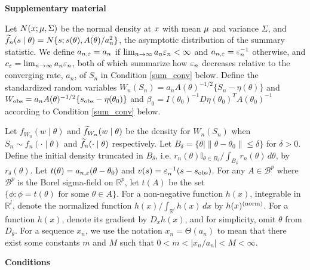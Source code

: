 \documentclass{article}
\begin{document}
{\bf Supplementary material}


\noindent Let $N({}{x};{}{\mu},\Sigma)$ be the normal density at ${}{x}$
with mean ${}{\mu}$ and variance $\Sigma$, and $\widetilde{f}_{n}({}{s}\mid{}{\theta})=N\{{}{s};{}{s}({}{\theta}),A({}{\theta})/a_{n}^{2}\}$, the asymptotic distribution of the summary statistic.
We define $a_{n,\varepsilon}=a_{n}$ if $\lim_{n\rightarrow\infty}a_{n}\varepsilon_{n}<\infty$
and $a_{n,\varepsilon}=\varepsilon_{n}^{-1}$ otherwise, and $c_{\varepsilon}=\lim_{n\rightarrow\infty}a_{n}\varepsilon_{n}$,
both of which summarize how $\varepsilon_{n}$ decreases relative to the
converging rate, $a_{n}$, of $S_{n}$ in Condition \ref{sum_conv} below. Define
the standardized random variables $W_{n}(S_{n})=a_{n}A(\theta)^{-1/2}\{S_{n}-\eta(\theta)\}$
and $W_{\rm obs}=a_{n}A(\theta)^{-1/2}\{s_{\rm obs}-\eta(\theta_0)\}$ and $\beta_{0}=I(\theta_0)^{-1}D\eta(\theta_0)^{T}A(\theta_0)^{-1}$ according to Condition \ref{sum_conv} below. 

Let $f_{W_{n}}(w\mid\theta)$ and
$\widetilde{f}_{W_{n}}(w\mid\theta)$ be the density for $W_{n}(S_{n})$ when
$S_{n}\sim f_{n}(\cdot\mid\theta)$ and $\widetilde{f}_n(\cdot\mid\theta)$ respectively.
Let $B_{\delta}=\{\theta\mid\|\theta-\theta_{0}\|\leq\delta\}$ for
$\delta>0$. Define the initial density truncated in $B_{\delta}$,
i.e. $r_{n}(\theta)\mathbb{I}_{\theta\in B_{\delta}}/\int_{B_{\delta}}r_{n}(\theta)\,d\theta$,
by $r_{\delta}(\theta)$. Let $t(\theta)=a_{n,\varepsilon}(\theta-\theta_{0})$
and $v(s)=\varepsilon_{n}^{-1}(s - s_{\rm obs})$. For any $A\in\mathscr{B}^{p}$
where $\mathscr{B}^{p}$ is the Borel sigma-field on $\mathbb{R}^{p}$,
let $t(A)$ be the set $\{\phi:\phi=t(\theta)\text{ for some }\theta\in A\}$.
For a non-negative function $h(x)$, integrable in $\mathbb{R}^{l}$,
denote the normalized function $h(x)/\int_{\mathbb{R}^{l}}h(x)\,dx$
by $h(x)^{({\rm norm})}$. For a function $h(x)$, denote its gradient
by $D_{x}h(x)$, and for simplicity, omit $\theta$ from $D_{\theta}$. For a sequence $x_n$, we use the notation $x_n = \Theta(a_n)$ to mean that there exist some constants $m$ and $M$ such that $0<m<\mid x_n/a_n \mid<M<\infty$.


\vspace{.5cm}
{\bf Conditions}
\end{document}
